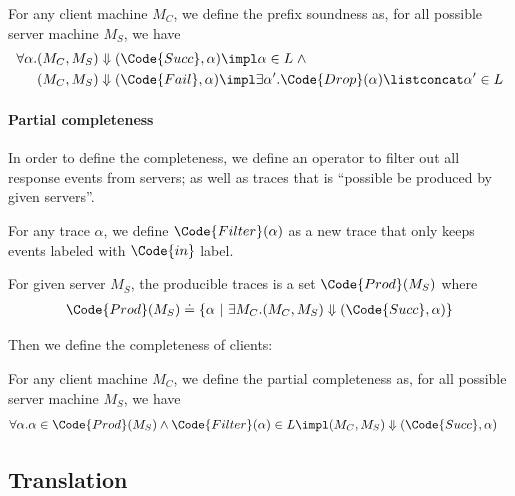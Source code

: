 \begin{definition} For any client machine $M_C$, we define the prefix soundness as, for all possible server machine $M_S$, we have
\begin{align*}
    \forall \alpha. &(M_C, M_S) \Downarrow (\Code{Succ}, \alpha) \impl \alpha \in L \;\land 
    \\&(M_C, M_S) \Downarrow (\Code{Fail}, \alpha) \impl \exists \alpha'. \Code{Drop}(\alpha) \listconcat \alpha' \in L
\end{align*}
\end{definition}

\paragraph{Partial completeness}  In order to define the completeness, we define an operator to filter out all response events from servers; as well as traces that is ``possible be produced by given servers''.

\begin{definition} For any trace $\alpha$, we define $\Code{Filter}(\alpha)$ as a new trace that only keeps events labeled with $\Code{in}$ label.
\end{definition}

\begin{definition} For given server $M_S$, the producible traces is a set $\Code{Prod}(M_S)$ where
\begin{align*}
    \Code{Prod}(M_S) \doteq \{\alpha ~|~ \exists M_C. (M_C, M_S) \Downarrow (\Code{Succ}, \alpha) \}
\end{align*}
\end{definition}

Then we define the completeness of clients:

\begin{definition} For any client machine $M_C$, we define the partial completeness as, for all possible server machine $M_S$, we have
\begin{align*}
    \forall \alpha. &\alpha \in \Code{Prod}(M_S) \land \Code{Filter}(\alpha) \in L \impl (M_C, M_S) \Downarrow (\Code{Succ}, \alpha)
\end{align*}
\end{definition}

\newpage

\subsection{Translation}

